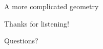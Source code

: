 \begin{frame}{A more complicated geometry}

\begin{figure}
  \centering
  \hspace{5pt}  
\end{figure}

\end{frame}

\begin{frame}

\begin{center}
\Huge{Thanks for listening!}
\end{center}

\begin{center}
\Huge{Questions?}
\end{center}
\end{frame}
